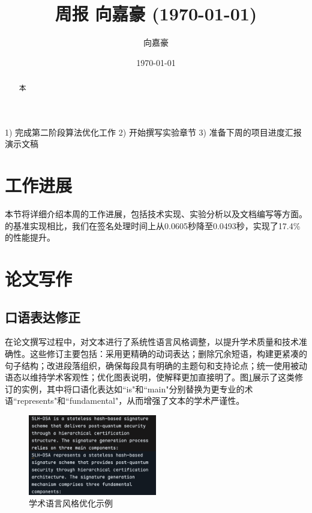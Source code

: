 \documentclass{article}
\title{周报 向嘉豪 (\today)}
\author{向嘉豪}
\date{\today}
\begin{document}
\maketitle

\begin{abstract}
  本
\end{abstract}

\begin{weekplan}
1) 完成第二阶段算法优化工作 2) 开始撰写实验章节 3) 准备下周的项目进度汇报演示文稿
\end{weekplan}

\section{工作进展}

本节将详细介绍本周的工作进展，包括技术实现、实验分析以及文档编写等方面。\cite{Wang2025}的基准实现相比，我们在签名处理时间上从0.0605秒降至0.0493秒，实现了17.4\%的性能提升。

\section{论文写作}

\subsection{口语表达修正}

在论文撰写过程中，对文本进行了系统性语言风格调整，以提升学术质量和技术准确性。这些修订主要包括：采用更精确的动词表达；删除冗余短语，构建更紧凑的句子结构；改进段落组织，确保每段具有明确的主题句和支持论点；统一使用被动语态以维持学术客观性；优化图表说明，使解释更加直接明了。图\ref{fig:example}展示了这类修订的实例，其中将口语化表达如``is"和``main"分别替换为更专业的术语``represents"和``fundamental"，从而增强了文本的学术严谨性。

\begin{figure}[htbp]
\centering
\includegraphics[width=0.5\textwidth]{./fig/fix_writing.png}
\caption{学术语言风格优化示例}
\label{fig:example}
\end{figure}

\end{document}
